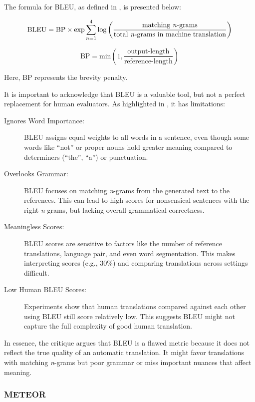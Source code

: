 {{The formula for BLEU, as defined in \textcite{koehn2020neural}, is presented below:

\begin{equation}
    \text{BLEU} = \text{BP} \times \exp \sum_{n=1}^{4} \log \left( \frac{\text{matching \emph{n}-grams}}{ \text{total \emph{n}-grams in machine translation}} \right) 
\end{equation}

\begin{equation}
    \text{BP} = \text{min} \left(1, \frac{\text{output-length}}{\text{reference-length}} \right)
\end{equation}

Here, BP represents the brevity penalty.

It is important to acknowledge that BLEU is a valuable tool, but not a perfect replacement for human evaluators. As highlighted in \textcite{koehn2020neural}, it has limitations:

\begin{description}
    \item[Ignores Word Importance:] 
    BLEU assigns equal weights to all words in a sentence, even though some words like ``not'' or proper nouns hold greater meaning compared to determiners (``the'', ``a'') or punctuation.
    \item[Overlooks Grammar:] BLEU focuses on matching \emph{n}-grams from the generated text to the references. This can lead to high scores for nonsensical sentences with the right \emph{n}-grams, but lacking overall grammatical correctness. 
    \item[Meaningless Scores:] BLEU scores are sensitive to factors like the number of reference translations, language pair, and even word segmentation. This makes interpreting scores (e.g., 30\%) and comparing translations across settings difficult.
    \item[Low Human BLEU Scores:] Experiments show that human translations compared against each other using BLEU still score relatively low. This suggests BLEU might not capture the full complexity of good human translation.
\end{description}


In essence, the critique argues that BLEU is a flawed metric because it does not reflect the true quality of an automatic translation. It might favor translations with matching \emph{n}-grams but poor grammar or miss important nuances that affect meaning.


\subsubsection{METEOR}

}}
